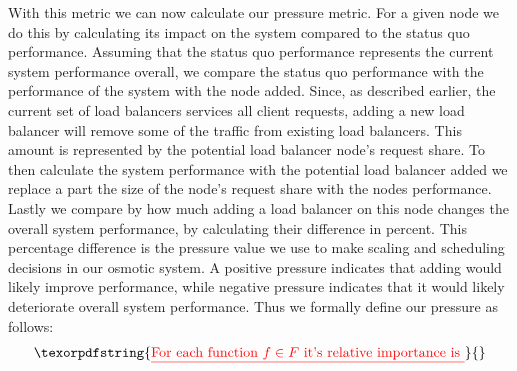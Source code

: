 \documentclass[draft,final]{vutinfth} %
\providecommand{\DIFdeltex}[1]{{\protect\color{red}\sout{#1}}}                      %
\providecommand{\DIFaddbegin}{} %
\providecommand{\DIFdelbegin}{} %
\providecommand{\DIFdelend}{} %
\providecommand{\DIFdel}[1]{\texorpdfstring{\DIFdeltex{#1}}{}} %
\begin{document}
With this metric we can now calculate our pressure metric. For a given node we do this by calculating its impact on the system compared to the status quo performance.
Assuming that the status quo performance represents the current system performance overall, we compare the status quo performance with the performance of the system with the node added.
Since, as described earlier, the current set of load balancers services all client requests, adding a new load balancer will remove some of the traffic from existing load balancers.
This amount is represented by the potential load balancer node's request share.
To then calculate the system performance with the potential load balancer added we replace a part the size of the node's request share with the nodes performance.
Lastly we compare by how much adding a load balancer on this node changes the overall system performance, by calculating their difference in percent.
This percentage difference is the pressure value we use to make scaling and scheduling decisions in our osmotic system.
A positive pressure indicates that adding would likely improve performance, while negative pressure indicates that it would likely deteriorate overall system performance.
Thus we formally define our pressure as follows:
\DIFdelbegin \[\DIFdel{\text{For each function }f \in F \text{ it's relative importance is }}\]%
\DIFdelend \DIFaddbegin 
\end{document}
